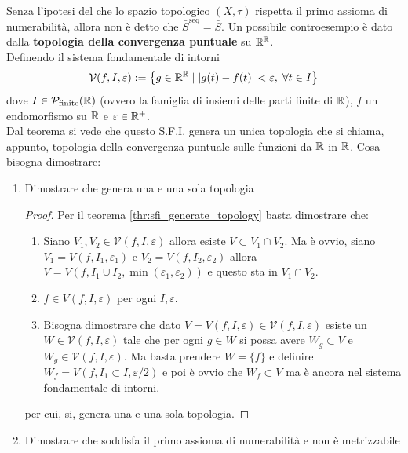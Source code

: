 \begin{remark}
	Senza l'ipotesi del che lo spazio topologico $(X,\tau)$ rispetta il primo assioma di numerabilità, allora non è detto che $\bar{S}^\text{seq} = \bar{S}$. Un possibile controesempio è dato dalla \textbf{topologia della convergenza puntuale} su $\mathbb{R}^{\mathbb{R}}$. \\
	Definendo il sistema fondamentale di intorni 
	\begin{equation}
	\begin{aligned}
	\mathcal{V}(f, I, \varepsilon) := \left\{ g \in \mathbb{R}^{\mathbb{R}} \; | \;  |g(t) - f(t)| < \varepsilon, \; \forall t \in I \right\}
	\end{aligned} 
	\end{equation}
	dove $I \in \mathcal{P}_\text{finite}(\mathbb{R})$ (ovvero la famiglia di insiemi delle parti finite di $\mathbb{R}$), $f$ un endomorfismo su $\mathbb{R}$ e $\varepsilon \in \mathbb{R}^+$. \\
	Dal teorema si vede che questo S.F.I. genera un unica topologia che si chiama, appunto, topologia della convergenza puntuale sulle funzioni da $\mathbb{R}$ in $\mathbb{R}$.
	Cosa bisogna dimostrare:
	\begin{enumerate}
		\item Dimostrare che genera una e una sola topologia 
		\begin{proof}
			Per il teorema \ref{thr:sfi_generate_topology} basta dimostrare che:
			\begin{enumerate}
				\item Siano $V_1, V_2 \in \mathcal{V}(f,I,\varepsilon)$ allora esiste $V \subset V_1 \cap V_2$. Ma è ovvio, siano $V_1 = V(f, I_1, \varepsilon_1)$ e $V_2 = V(f, I_2, \varepsilon_2)$ allora $V = V(f, I_1 \cup I_2, \min(\varepsilon_1, \varepsilon_2))$  e questo sta in $V_1 \cap V_2$.
				\item $f \in V(f, I, \varepsilon)$ per ogni $I, \varepsilon$.
				\item Bisogna dimostrare che dato $V = V(f, I, \varepsilon)\in \mathcal{V}(f,I,\varepsilon)$ esiste un $W \in \mathcal{V}(f,I,\varepsilon)$ tale che per ogni $g \in W$ si possa avere $W_g \subset V$ e $W_g \in \mathcal{V}(f,I, \varepsilon)$. Ma basta prendere $W = \{f\}$ e definire $W_f = V(f, I_1 \subset I, \varepsilon/2)$ e poi è ovvio che $W_f \subset V$ ma è ancora nel sistema fondamentale di intorni.
			\end{enumerate}
		per cui, si, genera una e una sola topologia.
		\end{proof}
		\item Dimostrare che soddisfa il primo assioma di numerabilità e non è metrizzabile

\end{enumerate}
\end{remark}
